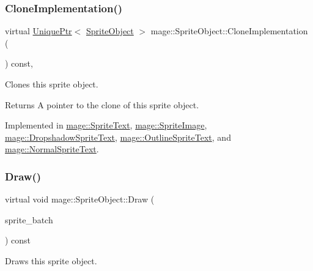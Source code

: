 \subsubsection{\texorpdfstring{Clone\+Implementation()}{CloneImplementation()}}
{\footnotesize\ttfamily virtual \hyperlink{namespacemage_a8c307fbcc33bce9b7f2aa4c26c3b95cf}{Unique\+Ptr}$<$ \hyperlink{classmage_1_1_sprite_object}{Sprite\+Object} $>$ mage\+::\+Sprite\+Object\+::\+Clone\+Implementation (\begin{DoxyParamCaption}{ }\end{DoxyParamCaption}) const\hspace{0.3cm}{\ttfamily [private]}, {}}

Clones this sprite object.

\begin{DoxyReturn}{Returns}
A pointer to the clone of this sprite object. 
\end{DoxyReturn}


Implemented in \hyperlink{classmage_1_1_sprite_text_a2b9f59a1730f8b9691f173251a2b4944}{mage\+::\+Sprite\+Text}, \hyperlink{classmage_1_1_sprite_image_a61e61349fd3435616893aae787feff37}{mage\+::\+Sprite\+Image}, \hyperlink{classmage_1_1_dropshadow_sprite_text_ae4b94b4120a9cae6bae11b61e7aed39b}{mage\+::\+Dropshadow\+Sprite\+Text}, \hyperlink{classmage_1_1_outline_sprite_text_af8d29408abb61c05a23499bf37c4c7b0}{mage\+::\+Outline\+Sprite\+Text}, and \hyperlink{classmage_1_1_normal_sprite_text_a261996eafdc02f39c6c57eb2b7ec2cea}{mage\+::\+Normal\+Sprite\+Text}.

\hypertarget{classmage_1_1_sprite_object_a1c1c885fe7846f7ee1cc0b73571c2fa0}{}\label{classmage_1_1_sprite_object_a1c1c885fe7846f7ee1cc0b73571c2fa0} 
\subsubsection{\texorpdfstring{Draw()}{Draw()}}
{\footnotesize\ttfamily virtual void mage\+::\+Sprite\+Object\+::\+Draw (\begin{DoxyParamCaption}\item[{Sprite\+Batch \&}]{sprite\+\_\+batch }\end{DoxyParamCaption}) const\hspace{0.3cm}{\ttfamily [pure virtual]}}

Draws this sprite object.


